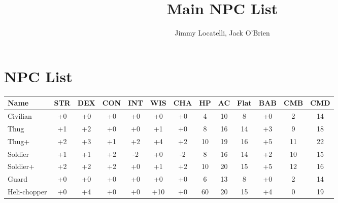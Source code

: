\documentclass[12pt,a4paper]{article}
\begin{document}
\title{Main NPC List}
\author{Jimmy Locatelli, Jack O'Brien}
\maketitle

\section{NPC List}
\begin{center}\footnotesize
	\begin{tabular*}{\textwidth}{ | l | c | c | c | c | c | c | c | c | c | c | c | c | } 
	Name & STR & DEX & CON & INT &  WIS & CHA & HP & AC & Flat & BAB & CMB & CMD \\
	\hline
	Civilian & +0 & +0 & +0 & +0 & +0 & +0 & 4 & 10 & 8 & +0 & 2 & 14 \\
	Thug & +1 & +2 & +0 & +0 & +1 & +0 & 8 & 16 & 14 & +3 & 9 & 18 \\
	Thug+ & +2 & +3 & +1 & +2 & +4 & +2 & 10 & 19 & 16 & +5 & 11 & 22 \\
	Soldier & +1 & +1 & +2 & -2 & +0 & -2 & 8   & 16 & 14 & +2 & 10 & 15 \\
	Soldier+ & +2 & +2 & +2 & +0 & +1 & +2 & 10 & 20 & 15 & +5 &  12 & 16 \\
	Guard & +0 & +0 & +0 & +0 & +0 & +0 & 6 & 13 & 8 & +0 & 2 & 14 \\
	Heli-chopper & +0 & +4 & +0 & +0 & +10 & +0 & 60 & 20 & 15 & +4 & 0 & 19 \\
	
	\end{tabular*}
\end{center}
\end{document}
